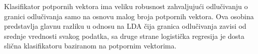 Klasifikator potpornih vektora ima veliku robusnost zahvaljujući odlučivanju o granici odlučivanja samo na osnovu malog broja potpornih vektora.
Ova osobina predstavlja glavnu razliku u odnosu na LDA čija granica odlučivanja zavisi od srednje vrednosti svakog podatka, sa druge strane logistička regresija je dosta
slična klasifikatoru baziranom na potpornim vektorima.

